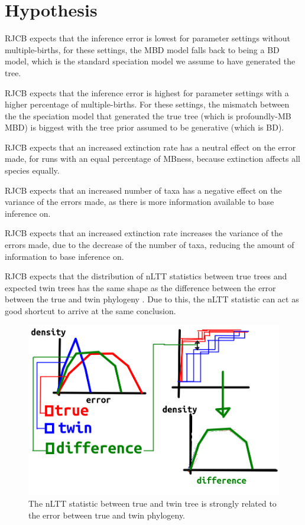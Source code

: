 \section{Hypothesis}

RJCB expects that the inference error is lowest for
parameter settings without multiple-births, for these settings, the
MBD model falls back to being a BD model, which is the standard speciation
model we assume to have generated the tree.

RJCB expects that the inference error is highest for
parameter settings with a higher percentage of multiple-births.
For these settings, the mismatch between the the speciation model that
generated the true tree (which is profoundly-MB MBD) is biggest with
the tree prior assumed to be generative (which is BD).

RJCB expects that an increased extinction rate
has a neutral effect on the error made, for runs with an equal percentage of MBness,
because extinction affects all species equally. 

RJCB expects that an increased number of taxa
has a negative effect on the variance of the errors made, as there
is more information available to base inference on.

RJCB expects that an increased extinction rate
increases the variance of the errors made,
due to the decrease of the number of taxa, reducing the amount of information
to base inference on.

RJCB expects that the distribution of nLTT statistics between
true trees and expected twin trees has the same shape
as the difference between the error between the true and twin phylogeny .
Due to this, the nLTT statistic can act as good shortcut
to arrive at the same conclusion.

\begin{figure}[!htbp]
  \includegraphics[width=\textwidth]{20191125_nltt_as_proxy.png}
  \caption{
    The nLTT statistic between true and twin tree is strongly related
    to the error between true and twin phylogeny.
  }
  \label{fig:nltt_as_proxy}
\end{figure}

